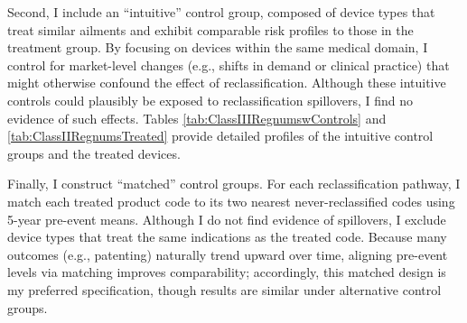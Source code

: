 \documentclass[letterpaper,12pt]{article}
\theoremstyle{definition}
\begin{document}
Second, I include an “intuitive” control group, composed of device types that treat similar ailments and exhibit comparable risk profiles to those in the treatment group. By focusing on devices within the same medical domain, I control for market-level changes (e.g., shifts in demand or clinical practice) that might otherwise confound the effect of reclassification. Although these intuitive controls could plausibly be exposed to reclassification spillovers, I find no evidence of such effects.\footnotemark {} Tables \ref{tab:ClassIIIRegnumswControls} and \ref{tab:ClassIIRegnumsTreated} provide detailed profiles of the intuitive control groups and the treated devices. 


Finally, I construct ``matched'' control groups. For each reclassification pathway, I match each treated product code to its two nearest never-reclassified codes using 5-year pre-event means.\footnotemark  
{} Although I do not find evidence of spillovers, I exclude device types that treat the same indications as the treated code. Because many outcomes (e.g., patenting) naturally trend upward over time, aligning pre-event levels via matching improves comparability; accordingly, this matched design is my preferred specification, though results are similar under alternative control groups.\footnotemark {}
\end{document}
